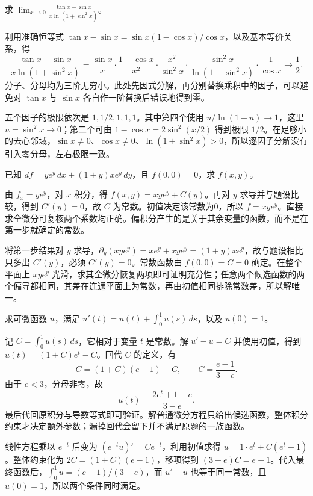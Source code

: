 \documentclass[UTF8,12pt,a4paper,fontset=fandol]{ctexart}
\begin{document}
\begin{example}\label{nm-final9-1a}
求 $\displaystyle\lim_{x\to0}\frac{\tan x-\sin x}{x\ln(1+\sin^2x)}$。
\end{example}
\begin{solve}
利用准确恒等式 $\tan x-\sin x=\sin x(1-\cos x)/\cos x$，以及基本等价关系，得
\[
 \frac{\tan x-\sin x}{x\ln(1+\sin^2x)}
 =\frac{\sin x}{x}\cdot\frac{1-\cos x}{x^2}
 \cdot\frac{x^2}{\sin^2x}\cdot
 \frac{\sin^2x}{\ln(1+\sin^2x)}\cdot\frac1{\cos x}
 \longrightarrow\frac12.
\]
分子、分母均为三阶无穷小。此处先因式分解，再分别替换乘积中的因子，可以避免对 $\tan x$ 与 $\sin x$ 各自作一阶替换后错误地得到零。

五个因子的极限依次是 $1,1/2,1,1,1$。其中第四个使用 $u/\ln(1+u)\to1$，这里 $u=\sin^2x\to0$；第二个可由 $1-\cos x=2\sin^2(x/2)$ 得到极限 $1/2$。在足够小的去心邻域，$\sin x\ne0$、$\cos x\ne0$、$\ln(1+\sin^2x)>0$，所以逐因子分解没有引入零分母，左右极限一致。

\end{solve}

\begin{example}\label{nm-final9-1c}
已知 $df=ye^y\,dx+(1+y)xe^y\,dy$，且 $f(0,0)=0$，求 $f(x,y)$。
\end{example}
\begin{solve}
由 $f_x=ye^y$，对 $x$ 积分，得 $f(x,y)=xye^y+C(y)$。再对 $y$ 求导并与题设比较，得到 $C'(y)=0$，故 $C$ 为常数。初值决定该常数为0，所以 $f=xye^y$。直接求全微分可复核两个系数均正确。偏积分产生的是关于其余变量的函数，而不是在第一步就确定的常数。

将第一步结果对 $y$ 求导，$\partial_y(xye^y)=xe^y+xye^y=(1+y)xe^y$，故与题设相比只多出 $C'(y)$，必须 $C'(y)=0$。常数函数由 $f(0,0)=C=0$ 确定。在整个平面上 $xye^y$ 光滑，求其全微分恢复两项即可证明充分性；任意两个候选函数的两个偏导都相同，其差在连通平面上为常数，再由初值相同排除常数差，所以解唯一。

\end{solve}

\begin{example}\label{nm-final9-1d}
求可微函数 $u$，满足 $\displaystyle u'(t)=u(t)+\int_0^1u(s)\,ds$，以及 $u(0)=1$。
\end{example}
\begin{solve}
记 $C=\int_0^1u(s)\,ds$，它相对于变量 $t$ 是常数。解 $u'-u=C$ 并使用初值，得到 $u(t)=(1+C)e^t-C$。回代 $C$ 的定义，有
\[
 C=(1+C)(e-1)-C,
 \qquad C=\frac{e-1}{3-e}.
\]
由于 $e<3$，分母非零，故
\[
 u(t)=\frac{2e^t+1-e}{3-e}.
\]
最后代回原积分与导数等式即可验证。解普通微分方程只给出候选函数，整体积分约束才决定额外参数；漏掉回代会留下并不满足原题的一族函数。

线性方程乘以 $e^{-t}$ 后变为 $(e^{-t}u)'=Ce^{-t}$，利用初值求得 $u=1\cdot e^t+C(e^t-1)$。整体约束化为 $2C=(1+C)(e-1)$，移项得到 $(3-e)C=e-1$。代入最终函数后，$\int_0^1u=(e-1)/(3-e)$，而 $u'-u$ 也等于同一常数，且 $u(0)=1$，所以两个条件同时满足。

\end{solve}
\end{document}
